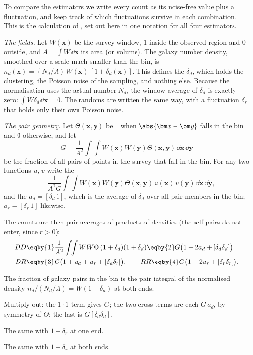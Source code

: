 To compare the estimators we write every count as its noise-free value plus a
fluctuation, and keep track of which fluctuations survive in each combination.
This is the calculation of \cite{LandySzalay1993}, set out here in one notation
for all four estimators.

\emph{The fields.} Let $W(\bm x)$ be the survey window, $1$ inside the observed
region and $0$ outside, and $A=\int W\,\dd\bm x$ its area (or volume). The galaxy
number density, smoothed over a scale much smaller than the bin, is
$n_d(\bm x)=(N_d/A)\,W(\bm x)\,[1+\delta_d(\bm x)]$. This defines the
 $\delta_d$, which holds the clustering, the Poisson
noise of the sampling, and nothing else. Because the normalisation uses the
actual number $N_d$, the window average of $\delta_d$ is exactly zero:
$\int W\delta_d\,\dd\bm x=0$. The randoms are written the same way, with a
fluctuation $\delta_r$ that holds only their own Poisson noise.

\emph{The pair geometry.} Let $\Theta(\bm x,\bm y)$ be $1$ when
$\abs{\bm x-\bm y}$ falls in the bin and $0$ otherwise, and let
\begin{equation*}
  G=\frac{1}{A^2}\int\!\!\int W(\bm x)W(\bm y)\Theta(\bm x,\bm y)\,\dd\bm x\,\dd\bm y
\end{equation*}
be the fraction of all pairs of points in the survey that fall in the bin. For any
two functions $u$, $v$ write the 
\begin{equation*}
  [u\,v]=\frac{1}{A^2G}\int\!\!\int W(\bm x)W(\bm y)\Theta(\bm x,\bm y)\,
  u(\bm x)\,v(\bm y)\,\dd\bm x\,\dd\bm y ,
\end{equation*}
and the  $a_d=[\delta_d\,1]$, which is the average of
$\delta_d$ over all pair members in the bin; $a_r=[\delta_r\,1]$ likewise.

The counts are then pair averages of products of densities (the self-pairs do not
enter, since $r>0$):
\begin{align}
  DD&\eqby{1}\frac{1}{A^2}\int\!\!\int WW\Theta\,(1+\delta_d)(1+\delta_d)
     \eqby{2} G\bigl(1+2a_d+[\delta_d\delta_d]\bigr),\nonumber\\
  DR&\eqby{3} G\bigl(1+a_d+a_r+[\delta_d\delta_r]\bigr),\qquad
  RR\eqby{4} G\bigl(1+2a_r+[\delta_r\delta_r]\bigr).
  \label{11a:eq:counts-expanded}
\end{align}
\begin{explain}
  \item The fraction of galaxy pairs in the bin is the pair integral of the
        normalised density $n_d/(N_d/A)=W(1+\delta_d)$ at both ends.
  \item Multiply out: the $1\cdot1$ term gives $G$; the two cross terms are each
        $G\,a_d$, by symmetry of $\Theta$; the last is $G[\delta_d\delta_d]$.
  \item The same with $1+\delta_r$ at one end.
  \item The same with $1+\delta_r$ at both ends.
\end{explain}

